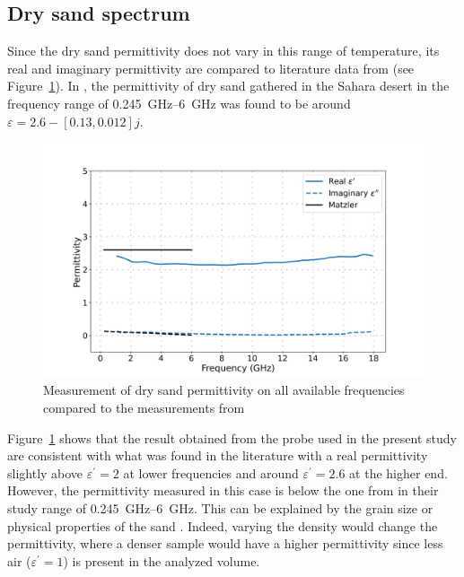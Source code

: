 \subsection{Dry sand spectrum}
Since the dry sand permittivity does not vary in this range of temperature, its real and imaginary permittivity are compared to literature data from \textcite{Matzler1998} (see Figure~\ref{fig:dry-sand}).
In \parencite{Matzler1998}, the permittivity of dry sand gathered in the Sahara desert in the frequency range of \qtyrange{0.245}{6}{\giga\hertz} was found to be around \(\varepsilon = 2.6 - \left[0.13, 0.012\right]j\).

\begin{figure}[ht!]
    \centering
    \includegraphics[width=\columnwidth]{Images/dry-sand.png}
    \caption[]{Measurement of dry sand permittivity on all available frequencies compared to the measurements from \textcite{Matzler1998}}\label{fig:dry-sand}
\end{figure}

Figure~\ref{fig:dry-sand} shows that the result obtained from the probe used in the present study are consistent with what was found in the literature with a real permittivity slightly above \(\varepsilon^\prime = 2\) at lower frequencies and around \(\varepsilon^\prime = 2.6\) at the higher end.
However, the permittivity measured in this case is below the one from \textcite{Matzler1998} in their study range of \qtyrange{0.245}{6}{\giga\hertz}.
This can be explained by the grain size or physical properties of the sand \parencite{Schmugge1980}.
Indeed, varying the density would change the permittivity, where a denser sample would have a higher permittivity since less air (\(\varepsilon^\prime = 1\)) is present in the analyzed volume. 

